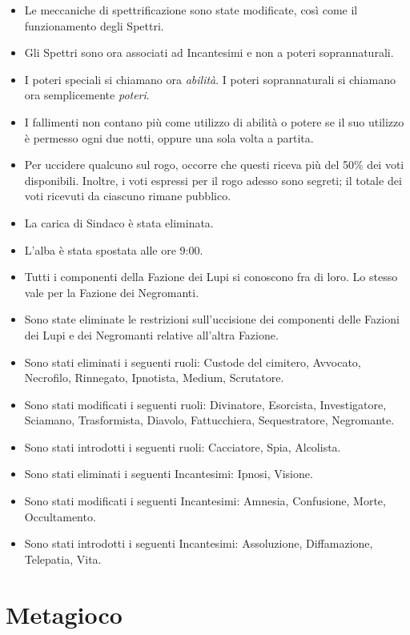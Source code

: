 \documentclass[a4paper,10pt]{article}
\begin{document}
\begin{itemize}
	\item Le meccaniche di spettrificazione sono state modificate, così come il funzionamento degli Spettri.
	\item Gli Spettri sono ora associati ad Incantesimi e non a poteri soprannaturali.
	\item I poteri speciali si chiamano ora \emph{abilità}. I poteri soprannaturali si chiamano ora semplicemente \emph{poteri}.
	\item I fallimenti non contano più come utilizzo di abilità o potere se il suo utilizzo è permesso ogni due notti, oppure una sola volta a partita.
	\item Per uccidere qualcuno sul rogo, occorre che questi riceva più del 50\% dei voti disponibili. Inoltre, i voti espressi per il rogo adesso sono segreti; il totale dei voti ricevuti da ciascuno rimane pubblico.
	\item La carica di Sindaco è stata eliminata.
	\item L'alba è stata spostata alle ore 9:00.
	\item Tutti i componenti della Fazione dei Lupi si conoscono fra di loro. Lo stesso vale per la Fazione dei Negromanti.
	\item Sono state eliminate le restrizioni sull'uccisione dei componenti delle Fazioni dei Lupi e dei Negromanti relative all'altra Fazione.
	\item Sono stati eliminati i seguenti ruoli: Custode del cimitero, Avvocato, Necrofilo, Rinnegato, Ipnotista, Medium, Scrutatore.
	\item Sono stati modificati i seguenti ruoli: Divinatore, Esorcista, Investigatore, Sciamano, Trasformista, Diavolo, Fattucchiera, Sequestratore, Negromante.
	\item Sono stati introdotti i seguenti ruoli: Cacciatore, Spia, Alcolista.
	\item Sono stati eliminati i seguenti Incantesimi: Ipnosi, Visione.
	\item Sono stati modificati i seguenti Incantesimi: Amnesia, Confusione, Morte, Occultamento.
	\item Sono stati introdotti i seguenti Incantesimi: Assoluzione, Diffamazione, Telepatia, Vita.
\end{itemize}

\pagebreak

\section{Metagioco}
\end{document}
